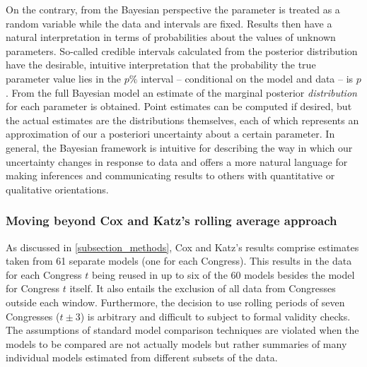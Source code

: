 On the contrary, from the Bayesian perspective the parameter is treated as a random 
variable while the data and intervals are fixed. Results then have a natural 
interpretation in terms of probabilities about the values of unknown parameters. 
So-called credible intervals calculated from the posterior distribution have the 
desirable, intuitive interpretation that the probability the true parameter value 
lies in the $p\%$ interval  -- conditional on the model and data -- is $p$.
From the full Bayesian model an estimate of the marginal posterior {\it distribution} 
for each parameter is obtained. Point estimates can be computed if desired, but the actual 
estimates are the distributions themselves, each of which represents an approximation of 
our a posteriori uncertainty about a certain parameter. In general, the Bayesian framework 
is intuitive for describing the way in which our uncertainty changes in response to data and 
offers a more natural language for making inferences and communicating results to others
with quantitative or qualitative orientations.

 
\subsubsection{Moving beyond Cox and Katz's rolling average approach}

As discussed in \ref{subsection_methods}, Cox and Katz's results comprise estimates taken 
from 61 separate models (one for each Congress). This results in the data for each Congress 
$t$ being reused in up to six of the 60 models besides the model for Congress $t$ itself. It also 
entails the exclusion of all data from Congresses outside each window. Furthermore, the decision
to use rolling periods of seven Congresses ($t \pm 3$) is arbitrary and difficult to subject to formal
validity checks. The assumptions of standard model comparison techniques are violated when the 
models to be compared are not actually models but rather summaries of many individual 
models estimated from different subsets of the data. 

